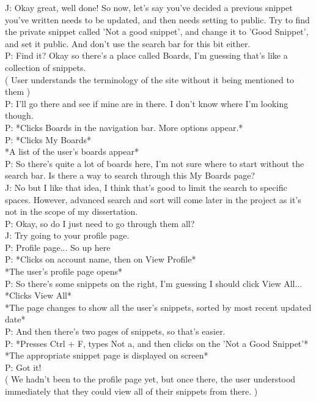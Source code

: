 J: \-\hspace{1.4cm}Okay great, well done! So now, let's say you've decided a previous snippet you've written needs to be updated, and then needs setting to public. Try to find the private snippet called 'Not a good snippet', and change it to 'Good Snippet', and set it public. And don't use the search bar for this bit either. \\
P: Find it? Okay so there's a place called Boards, I'm guessing that's like a collection of snippets.  \\
( User understands the terminology of the site without it being mentioned to them ) \\
P: I'll go there and see if mine are in there. I don't know where I'm looking though.  \\
P: *Clicks Boards in the navigation bar. More options appear.* \\
P: *Clicks My Boards* \\
*A list of the user's boards appear* \\
P: So there's quite a lot of boards here, I'm not sure where to start without the search bar. Is there a way to search through this My Boards page? \\
J: \-\hspace{1.4cm}No but I like that idea, I think that's good to limit the search to specific spaces. However, advanced search and sort will come later in the project as it's not in the scope of my dissertation. \\
P: Okay, so do I just need to go through them all? \\
J: \-\hspace{1.4cm}Try going to your profile page. \\
P: Profile page... So up here  \\
P: *Clicks on account name, then on View Profile* \\
*The user's profile page opens* \\
P: So there's some snippets on the right, I'm guessing I should click View All... *Clicks View All* \\
*The page changes to show all the user's snippets, sorted by most recent updated date* \\
P: And then there's two pages of snippets, so that's easier.  \\
P: *Presses Ctrl + F, types Not a, and then clicks on the 'Not a Good Snippet'* \\
*The appropriate snippet page is displayed on screen* \\
P: Got it! \\
( We hadn't been to the profile page yet, but once there, the user understood immediately that they could view all of their snippets from there. )

